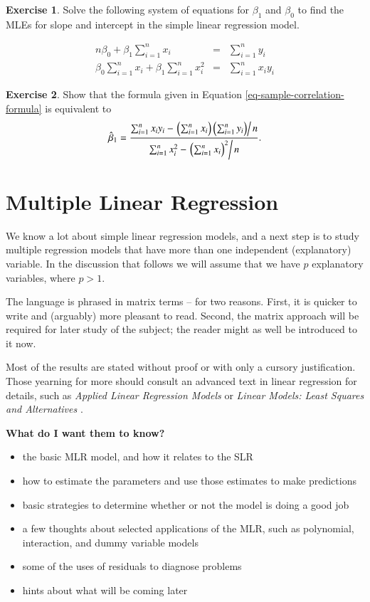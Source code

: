 \documentclass[]{book}
\providecommand{\tightlist}{%
  \setlength{\itemsep}{0pt}\setlength{\parskip}{0pt}}
\numberwithin{equation}{chapter}
\numberwithin{figure}{chapter}
\theoremstyle{plain}
\theoremstyle{definition}
\newtheorem{xca}{Exercise}[chapter]
\theoremstyle{remark}
\theoremstyle{definition}
\theoremstyle{definition}
\theoremstyle{remark}
\begin{document}
\bigskip

\begin{xca}
Solve the following system of equations for \(\beta_{1}\) and
\(\beta_{0}\) to find the MLEs for slope and intercept in the simple
linear regression model.

\begin{eqnarray*}
n\beta_{0}+\beta_{1}\sum_{i=1}^{n}x_{i} & = & \sum_{i=1}^{n}y_{i}\\
\beta_{0}\sum_{i=1}^{n}x_{i}+\beta_{1}\sum_{i=1}^{n}x_{i}^{2} & = & \sum_{i=1}^{n}x_{i}y_{i}
\end{eqnarray*}
\end{xca}

\bigskip

\begin{xca}
Show that the formula given in Equation
\eqref{eq-sample-correlation-formula} is equivalent to \[
\hat{\beta}_{1} =
\frac{\sum_{i=1}^{n}x_{i}y_{i}-\left.\left(\sum_{i=1}^{n}x_{i}\right)\left(\sum_{i=1}^{n}y_{i}\right)\right/
n}{\sum_{i=1}^{n}x_{i}^{2}-\left.\left(\sum_{i=1}^{n}x_{i}\right)^{2}\right/
n}.  \]
\end{xca}

\chapter{Multiple Linear
Regression}\label{cha-multiple-linear-regressionl}

We know a lot about simple linear regression models, and a next step is
to study multiple regression models that have more than one independent
(explanatory) variable. In the discussion that follows we will assume
that we have \(p\) explanatory variables, where \(p > 1\).

The language is phrased in matrix terms -- for two reasons. First, it is
quicker to write and (arguably) more pleasant to read. Second, the
matrix approach will be required for later study of the subject; the
reader might as well be introduced to it now.

Most of the results are stated without proof or with only a cursory
justification. Those yearning for more should consult an advanced text
in linear regression for details, such as \emph{Applied Linear
Regression Models} \autocite{Neter1996} or \emph{Linear Models: Least
Squares and Alternatives} \autocite{Rao1999}.

\textbf{What do I want them to know?}

\begin{itemize}
\tightlist
\item
  the basic MLR model, and how it relates to the SLR
\item
  how to estimate the parameters and use those estimates to make
  predictions
\item
  basic strategies to determine whether or not the model is doing a good
  job
\item
  a few thoughts about selected applications of the MLR, such as
  polynomial, interaction, and dummy variable models
\item
  some of the uses of residuals to diagnose problems
\item
  hints about what will be coming later
\end{itemize}
\end{document}
